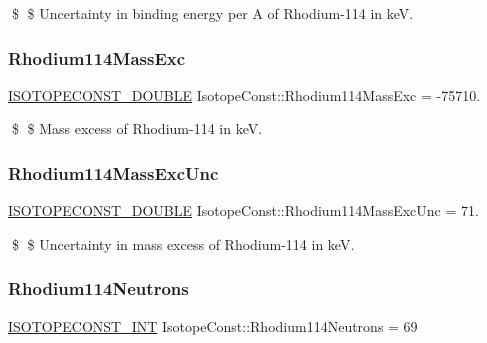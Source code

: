 \$ \$ Uncertainty in binding energy per A of Rhodium-\/114 in keV. \mbox{\label{group___isotope_const-_rhodium-_rh114_ga05adaa4683e61ce9d24cfad9f94d1f53}} 
\subsubsection{\texorpdfstring{Rhodium114\+Mass\+Exc}{Rhodium114MassExc}}
{\footnotesize\ttfamily \mbox{\hyperlink{group___isotope_const-_macros_ga8f45a7272ce02c0b4c65c44636ed719a}{I\+S\+O\+T\+O\+P\+E\+C\+O\+N\+S\+T\+\_\+\+D\+O\+U\+B\+LE}} Isotope\+Const\+::\+Rhodium114\+Mass\+Exc = -\/75710.}

\$ \$ Mass excess of Rhodium-\/114 in keV. \mbox{\label{group___isotope_const-_rhodium-_rh114_gab5472fbe31b5fe8eb36ca4e52de5b303}} 
\subsubsection{\texorpdfstring{Rhodium114\+Mass\+Exc\+Unc}{Rhodium114MassExcUnc}}
{\footnotesize\ttfamily \mbox{\hyperlink{group___isotope_const-_macros_ga8f45a7272ce02c0b4c65c44636ed719a}{I\+S\+O\+T\+O\+P\+E\+C\+O\+N\+S\+T\+\_\+\+D\+O\+U\+B\+LE}} Isotope\+Const\+::\+Rhodium114\+Mass\+Exc\+Unc = 71.}

\$ \$ Uncertainty in mass excess of Rhodium-\/114 in keV. \mbox{\label{group___isotope_const-_rhodium-_rh114_ga94cf4aa313c95ae04ae8ef70149b4fd6}} 
\subsubsection{\texorpdfstring{Rhodium114\+Neutrons}{Rhodium114Neutrons}}
{\footnotesize\ttfamily \mbox{\hyperlink{group___isotope_const-_macros_ga5f18360b3e99483a35c32d789e62621c}{I\+S\+O\+T\+O\+P\+E\+C\+O\+N\+S\+T\+\_\+\+I\+NT}} Isotope\+Const\+::\+Rhodium114\+Neutrons = 69}

